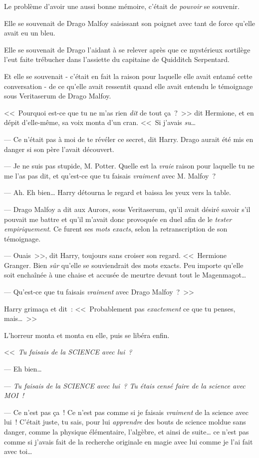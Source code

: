 Le problème d'avoir une aussi bonne mémoire, c'était de \emph{pouvoir} se souvenir.

Elle se souvenait de Drago Malfoy saisissant son poignet avec tant de force qu'elle avait eu un bleu.

Elle se souvenait de Drago l'aidant à se relever après que ce mystérieux sortilège l'eut faite trébucher dans l'assiette du capitaine de Quidditch Serpentard.

Et elle se souvenait - c'était en fait la raison pour laquelle elle avait entamé cette conversation - de ce qu'elle avait ressentit quand elle avait entendu le témoignage sous Veritaserum de Drago Malfoy.

<<~Pourquoi est-ce que tu ne m'as rien \emph{dit} de tout ça~?~>> dit Hermione, et en dépit d'elle-même, sa voix monta d'un cran. <<~Si j'avais \emph{su}…

--- Ce n'était pas à moi de te révéler ce secret, dit Harry. Drago aurait été mis en danger si son père l'avait découvert.

--- Je ne suis pas stupide, M. Potter. Quelle est la \emph{vraie} raison pour laquelle tu ne me l'as pas dit, et qu'est-ce que tu faisais \emph{vraiment} avec M. Malfoy~?

--- Ah. Eh bien… Harry détourna le regard et baissa les yeux vers la table.

--- Drago Malfoy a dit aux Aurors, sous Veritaserum, qu'il avait désiré savoir s'il pouvait me battre et qu'il m'avait donc provoquée en duel afin de le \emph{tester empiriquement}. Ce furent ses \emph{mots exacts}, selon la retranscription de son témoignage.

--- Ouais~>>, dit Harry, toujours sans croiser son regard. <<~Hermione Granger. Bien \emph{sûr} qu'elle se souviendrait des mots exacts. Peu importe qu'elle soit enchaînée à une chaise et accusée de meurtre devant tout le Magenmagot…

--- Qu'est-ce que tu faisais \emph{vraiment} avec Drago Malfoy~?~>>

Harry grimaça et dit~: <<~Probablement pas \emph{exactement} ce que tu penses, mais…~>>

L'horreur monta et monta en elle, puis se libéra enfin.

<<~\emph{Tu faisais de la SCIENCE avec lui~?}

--- Eh bien…

--- \emph{Tu faisais de la SCIENCE avec lui~? Tu étais censé faire de la science avec MOI~!}

--- Ce n'est pas ça~! Ce n'est pas comme si je faisais \emph{vraiment} de la science avec lui~! C'était juste, tu sais, pour lui \emph{apprendre} des bouts de science moldue sans danger, comme la physique élémentaire, l'algèbre, et ainsi de suite… ce n'est pas comme si j'avais fait de la recherche originale en magie avec lui comme je l'ai fait avec toi…

